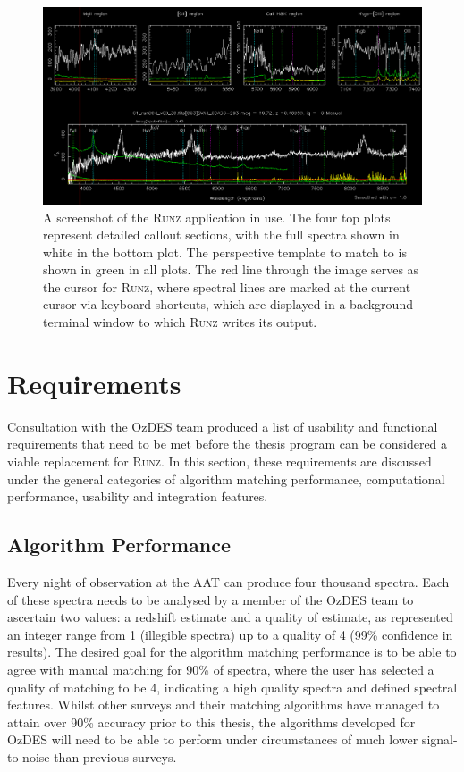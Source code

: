 \documentclass[titlesmallcaps, examinerscopy, copyrightpage]{uqthesis}
\newcommand{\runz}{\textsc{Runz}}
\begin{document}
\begin{figure}[ht!]
\includegraphics[width=1\textwidth]{images/RunzScreen.PNG} 
\centering
\caption{A screenshot of the \runz{} application in use. The four top plots represent detailed callout sections, with the full spectra shown in white in the bottom plot. The perspective template to match to is shown in green in all plots. The red line through the image serves as the cursor for \runz{}, where spectral lines are marked at the current cursor via keyboard shortcuts, which are displayed in a background terminal window to which \runz{} writes its output.}
\label{fig:runz}
\end{figure}




\chapter{Requirements}
\label{ch:req}

Consultation with the OzDES team produced a list of usability and functional requirements that need to be met before the thesis program can be considered a viable replacement for \textsc{Runz}. In this section, these requirements are discussed under the general categories of algorithm matching performance, computational performance, usability and integration features.
\section{Algorithm Performance}

Every night of observation at the AAT can produce four thousand spectra. Each of these spectra needs to be analysed by a member of the OzDES team to ascertain two values: a redshift estimate and a quality of estimate, as represented an integer range from 1 (illegible spectra) up to a quality of 4 (99\% confidence in results). The desired goal for the algorithm matching performance is to be able to agree with manual matching for 90\% of spectra, where the user has selected a quality of matching to be 4, indicating a high quality spectra and defined spectral features. Whilst other surveys and their matching algorithms have managed to attain over 90\% accuracy prior to this thesis, the algorithms developed for OzDES will need to be able to perform under circumstances of much lower signal-to-noise than previous surveys.
\end{document}

